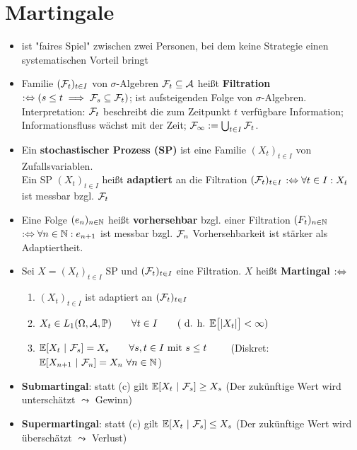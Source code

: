 \documentclass[12pt]{scrartcl}
\begin{document}
	\section{Martingale}
	\begin{itemize}
		\item ist "faires Spiel" zwischen zwei Personen, bei dem keine Strategie einen systematischen Vorteil bringt
		\item Familie $(\mathcal{F}_t)_{t\in I}$ von $\sigma$-Algebren $\mathcal{F}_t\subseteq\mathcal{A}$ heißt \textbf{Filtration} 
		$:\Leftrightarrow( s\leq t\implies\mathcal{F}_s\subseteq\mathcal{F}_t)$; 
		ist aufsteigenden Folge von $\sigma$-Algebren.
		Interpretation: $\mathcal{F}_t$ beschreibt die zum Zeitpunkt $t$ verfügbare Information;
		Informationsfluss wächst mit der Zeit;
		$\mathcal{F}_\infty:=\bigcup_{t\in I}\mathcal{F}_t$.
		\item Ein \textbf{stochastischer Prozess (SP)} ist eine Familie $(X_t)_{t\in I}$ von Zufallsvariablen.\\
		Ein SP $(X_t)_{t\in I}$ heißt \textbf{adaptiert} an die Filtration $(\mathcal{F}_t)_{t\in I}$
		$:\Leftrightarrow\forall t\in I: X_t$ ist messbar bzgl. $\mathcal{F}_t$
		\item Eine Folge $(e_n)_{n\in\mathbb{N}}$ heißt \textbf{vorhersehbar} bzgl. einer Filtration $(F_t)_{n\in\mathbb{N}}$
		$:\Leftrightarrow\forall n\in\mathbb{N}:e_{n+1}$ ist messbar bzgl. $\mathcal{F}_n$
		Vorhersehbarkeit ist stärker als Adaptiertheit.
		\item Sei $X=(X_t)_{t\in I}$ SP und $(\mathcal{F}_t)_{t\in I}$ eine Filtration.
		$X$ heißt \textbf{Martingal} $:\Leftrightarrow$
		\begin{enumerate}[label=(\alph*)]
			\item $(X_t)_{t\in I}$ ist adaptiert an $(\mathcal{F}_t)_{t\in I}$
			\item $\begin{aligned}
				X_t\in L_1(\Omega,\mathcal{A},\mathbb{P}) \qquad \forall t\in I\qquad(\text{ d. h. } \mathbb{E}\big[|X_t|\big]<\infty)
			\end{aligned}$
			\item $\begin{aligned}
				\mathbb{E}[X_t~|~\mathcal{F}_s]=X_s\qquad\forall s,t\in I\text{ mit } s\leq t
			\end{aligned}\qquad$
			(Diskret:
		$ \mathbb{E}[X_{n+1}~|~\mathcal{F}_n]=X_n~\forall n\in\mathbb{N}$) 
		\end{enumerate}
		\item \textbf{Submartingal}: statt (c) gilt $\mathbb{E}[X_t~|~\mathcal{F}_s]\geq X_s$ (Der zukünftige Wert wird unterschätzt $\leadsto$ Gewinn)
		\item \textbf{Supermartingal}: statt (c) gilt $\mathbb{E}[X_t~|~\mathcal{F}_s]\leq X_s$ (Der zukünftige Wert wird überschätzt $\leadsto$ Verlust)

\end{itemize}
\end{document}
